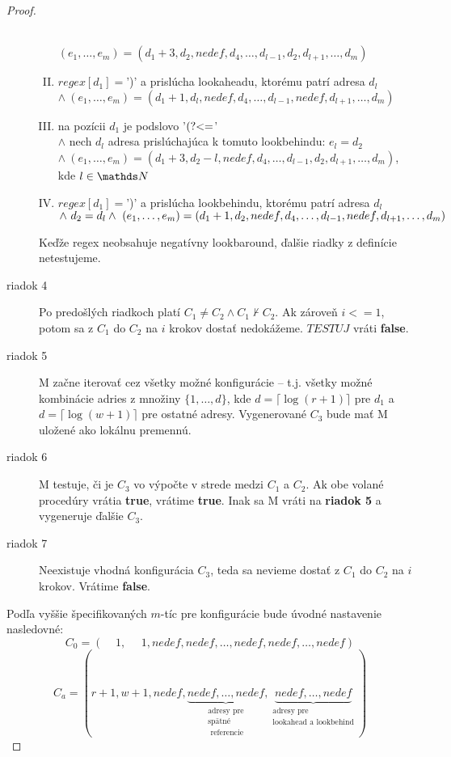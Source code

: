 \begin{proof}
\begin{description}
\begin{enumerate}[I.]
\\ $(e_1,\dots,e_m)=(d_1+3,d_2,nedef,d_4,\dots,d_{l-1},d_2,d_{l+1},\dots,d_m)$
\item $regex[d_1]=$')' a prislúcha lookaheadu, ktorému patrí adresa $d_l$ 
\\ $\wedge ~(e_1,\dots,e_m)=(d_1+1,d_l,nedef,d_4,\dots,d_{l-1},nedef,d_{l+1},\dots,d_m)$
\item na pozícii $d_1$ je podslovo '$\text{(?\textless =}$' 
\\ $\wedge$ nech $d_l$ adresa prislúchajúca k tomuto lookbehindu: $e_l=d_2$ 
\\ $\wedge ~(e_1,\dots,e_m)=(d_1+3,d_2-l,nedef,d_4,\dots,d_{l-1},d_2,d_{l+1},\dots,d_m)$, kde $l\in\N$
\item $regex[d_1]=$')' a prislúcha lookbehindu, ktorému patrí adresa $d_l$ \\ $\wedge ~ d_2=d_l \\ \wedge ~(e_1,\dots,e_m)=(d_1+1,d_2,nedef,d_4,\dots,d_{l-1},nedef,d_{l+1},\dots,d_m)$
\end{enumerate}
Keďže regex neobsahuje negatívny lookbaround, ďalšie riadky z definície netestujeme.
\item[riadok 4] Po predošlých riadkoch platí $C_1\neq C_2 \wedge C_1 \nvdash C_2$. Ak zároveň $i<=1$, potom sa z $C_1$ do $C_2$ na $i$ krokov dostať nedokážeme. $TESTUJ$ vráti \textbf{false}.
\item[riadok 5] M začne iterovať cez všetky možné konfigurácie -- t.j. všetky možné kombinácie adries z množiny $\lbrace 1,\dots,d\rbrace$, kde $d=\lceil\log(r+1)\rceil$ pre $d_1$ a $d=\lceil\log(w+1)\rceil$ pre ostatné adresy. Vygenerované $C_3$ bude mať M uložené ako lokálnu premennú.
\item[riadok 6] M testuje, či je $C_3$ vo výpočte v strede medzi $C_1$ a $C_2$. Ak obe volané procedúry vrátia \textbf{true}, vrátime \textbf{true}. Inak sa M vráti na \textbf{riadok 5} a vygeneruje ďalšie $C_3$.
\item[riadok 7] Neexistuje vhodná konfigurácia $C_3$, teda sa nevieme dostať z $C_1$ do $C_2$ na $i$ krokov. Vrátime \textbf{false}.
\end{description}

Podľa vyššie špecifikovaných $m$-tíc pre konfigurácie bude úvodné nastavenie nasledovné: $$C_0=(~~~~~1,~~~~~~1,nedef,nedef,\dots,nedef,nedef,\dots,nedef)$$
$$C_a=(r+1,w+1,nedef,\underbrace{nedef,\dots,nedef}_{\substack{\text{adresy pre}\\\text{spätné}\\\text{ referencie}}},\underbrace{nedef,\dots,nedef}_{\substack{\text{adresy pre}\\\text{lookahead a lookbehind}}})$$


\end{proof}
